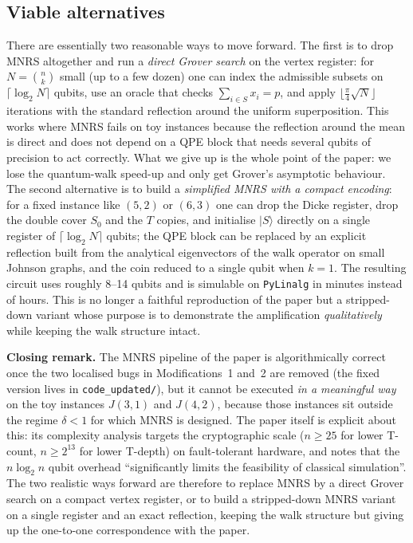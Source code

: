 \documentclass[11pt,a4paper]{article}
\begin{document}
\subsection{Viable alternatives}

There are essentially two reasonable ways to move forward. The first
is to drop MNRS altogether and run a \emph{direct Grover search} on
the vertex register: for $N=\binom{n}{k}$ small (up to a few dozen)
one can index the admissible subsets on $\lceil\log_2 N\rceil$ qubits,
use an oracle that checks $\sum_{i\in S}x_i=p$, and apply
$\lfloor \tfrac{\pi}{4}\sqrt{N}\rfloor$ iterations with the standard
reflection around the uniform superposition. This works where MNRS
fails on toy instances because the reflection around the mean is
direct and does not depend on a QPE block that needs several qubits
of precision to act correctly. What we give up is the whole point of
the paper: we lose the quantum-walk speed-up and only get Grover's
asymptotic behaviour. The second alternative is to build a
\emph{simplified MNRS with a compact encoding}: for a fixed instance
like $(5,2)$ or $(6,3)$ one can drop the Dicke register, drop the
double cover $S_0$ and the $T$ copies, and initialise $|S\rangle$
directly on a single register of $\lceil\log_2 N\rceil$ qubits; the
QPE block can be replaced by an explicit reflection built from the
analytical eigenvectors of the walk operator on small Johnson graphs,
and the coin reduced to a single qubit when $k=1$. The resulting
circuit uses roughly 8--14 qubits and is simulable on
\texttt{PyLinalg} in minutes instead of hours. This is no longer a
faithful reproduction of the paper but a stripped-down variant whose
purpose is to demonstrate the amplification \emph{qualitatively}
while keeping the walk structure intact.

\medskip
\noindent\textbf{Closing remark.} The MNRS pipeline of the paper is
algorithmically correct once the two localised bugs in
Modifications~1 and~2 are removed (the fixed version lives in
\texttt{code\_updated/}), but it cannot be executed \emph{in a
meaningful way} on the toy instances $J(3,1)$ and $J(4,2)$, because
those instances sit outside the regime $\delta<1$ for which MNRS is
designed. The paper itself is explicit about this: its complexity
analysis targets the cryptographic scale ($n\ge 25$ for lower T-count,
$n\ge 2^{13}$ for lower T-depth) on fault-tolerant hardware, and notes
that the $n\log_2 n$ qubit overhead ``significantly limits the
feasibility of classical simulation''. The two realistic ways forward
are therefore to replace MNRS by a direct Grover search on a compact
vertex register, or to build a stripped-down MNRS variant on a single
register and an exact reflection, keeping the walk structure but
giving up the one-to-one correspondence with the paper.
\end{document}
